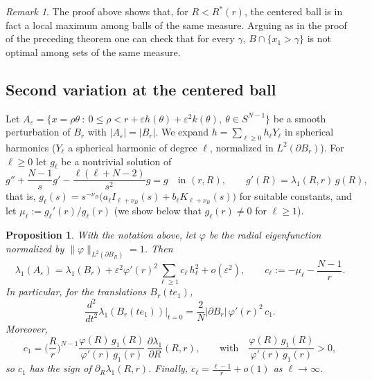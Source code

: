 \documentclass[11pt]{amsart}
\newtheorem{proposition}[lemma]{Proposition}
\theoremstyle{remark}
\newtheorem{remark}[lemma]{Remark}
\numberwithin{equation}{section}
\begin{document}
\begin{remark}
The proof above shows that, for $R<R^*(r)$, the centered ball is in fact a local maximum among balls of the same measure. Arguing as in the proof of the preceding theorem one can check that for every $\gamma$, $B\cap\{x_1>\gamma\}$ is not optimal among sets of the same measure.
\end{remark}

\subsection{Second variation at the centered ball}
Let $A_\varepsilon=\{x=\rho\theta\ :\ 0\le\rho<r+\varepsilon h(\theta)+\varepsilon^2k(\theta),\ \theta\in S^{N-1}\}$ be a smooth perturbation of $B_r$ with $|A_\varepsilon|=|B_r|$. We expand $h=\sum_{\ell\ge0}h_\ell Y_\ell$ in spherical harmonics ($Y_\ell$ a spherical harmonic of degree $\ell$, normalized in $L^2(\partial B_r)$). For $\ell\ge0$ let $g_\ell$ be a nontrivial solution of
\begin{equation}\label{mode}
g''+\frac{N-1}sg'-\frac{\ell(\ell+N-2)}{s^2}g=g\quad\text{in }(r,R),\qquad g'(R)=\lambda_1(R,r)\,g(R),
\end{equation}
that is, $g_\ell(s)=s^{-\nu_B}\big(a_\ell I_{\ell+\nu_B}(s)+b_\ell K_{\ell+\nu_B}(s)\big)$ for suitable constants, and let $\mu_\ell:=g_\ell'(r)/g_\ell(r)$ (we show below that $g_\ell(r)\neq0$ for $\ell\ge1$).

\begin{proposition}\label{p.second}
With the notation above, let $\varphi$ be the radial eigenfunction normalized by $\|\varphi\|_{L^2(\partial B_R)}=1$. Then
\begin{equation}\label{second}
\lambda_1(A_\varepsilon)=\lambda_1(B_r)+\varepsilon^2\varphi'(r)^2\sum_{\ell\ge1}c_\ell\,h_\ell^2+o(\varepsilon^2),\qquad c_\ell:=-\mu_\ell-\frac{N-1}r.
\end{equation}
In particular, for the translations $B_r(te_1)$,
\begin{equation}\label{transl}
\frac{d^2}{dt^2}\lambda_1(B_r(te_1))\Big|_{t=0}=\frac2N|\partial B_r|\,\varphi'(r)^2\,c_1.
\end{equation}
Moreover,
\begin{equation}\label{c1sign}
c_1=\Big(\frac Rr\Big)^{N-1}\frac{\varphi(R)\,g_1(R)}{\varphi'(r)\,g_1(r)}\,\frac{\partial\lambda_1}{\partial R}(R,r),\qquad\text{with}\quad\frac{\varphi(R)\,g_1(R)}{\varphi'(r)\,g_1(r)}>0,
\end{equation}
so $c_1$ has the sign of $\partial_R\lambda_1(R,r)$. Finally, $c_\ell=\frac{\ell-1}r+o(1)$ as $\ell\to\infty$.
\end{proposition}
\end{document}
